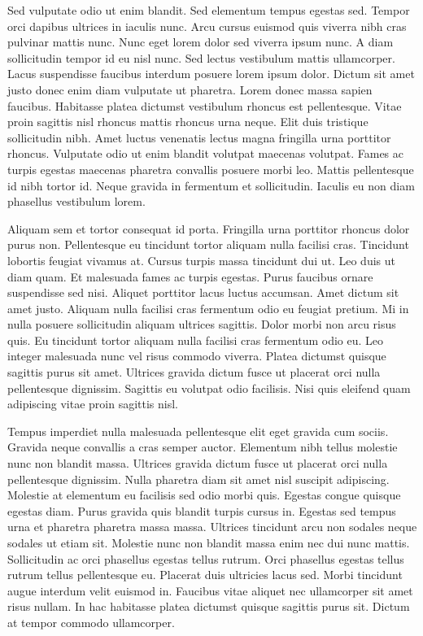 \documentclass[conference]{IEEEtran}
\begin{document}
Sed vulputate odio ut enim blandit. Sed elementum tempus egestas sed. Tempor orci dapibus ultrices in iaculis nunc. Arcu cursus euismod quis viverra nibh cras pulvinar mattis nunc. Nunc eget lorem dolor sed viverra ipsum nunc. A diam sollicitudin tempor id eu nisl nunc. Sed lectus vestibulum mattis ullamcorper. Lacus suspendisse faucibus interdum posuere lorem ipsum dolor. Dictum sit amet justo donec enim diam vulputate ut pharetra. Lorem donec massa sapien faucibus. Habitasse platea dictumst vestibulum rhoncus est pellentesque. Vitae proin sagittis nisl rhoncus mattis rhoncus urna neque. Elit duis tristique sollicitudin nibh. Amet luctus venenatis lectus magna fringilla urna porttitor rhoncus. Vulputate odio ut enim blandit volutpat maecenas volutpat. Fames ac turpis egestas maecenas pharetra convallis posuere morbi leo. Mattis pellentesque id nibh tortor id. Neque gravida in fermentum et sollicitudin. Iaculis eu non diam phasellus vestibulum lorem.

Aliquam sem et tortor consequat id porta. Fringilla urna porttitor rhoncus dolor purus non. Pellentesque eu tincidunt tortor aliquam nulla facilisi cras. Tincidunt lobortis feugiat vivamus at. Cursus turpis massa tincidunt dui ut. Leo duis ut diam quam. Et malesuada fames ac turpis egestas. Purus faucibus ornare suspendisse sed nisi. Aliquet porttitor lacus luctus accumsan. Amet dictum sit amet justo. Aliquam nulla facilisi cras fermentum odio eu feugiat pretium. Mi in nulla posuere sollicitudin aliquam ultrices sagittis. Dolor morbi non arcu risus quis. Eu tincidunt tortor aliquam nulla facilisi cras fermentum odio eu. Leo integer malesuada nunc vel risus commodo viverra. Platea dictumst quisque sagittis purus sit amet. Ultrices gravida dictum fusce ut placerat orci nulla pellentesque dignissim. Sagittis eu volutpat odio facilisis. Nisi quis eleifend quam adipiscing vitae proin sagittis nisl.

Tempus imperdiet nulla malesuada pellentesque elit eget gravida cum sociis. Gravida neque convallis a cras semper auctor. Elementum nibh tellus molestie nunc non blandit massa. Ultrices gravida dictum fusce ut placerat orci nulla pellentesque dignissim. Nulla pharetra diam sit amet nisl suscipit adipiscing. Molestie at elementum eu facilisis sed odio morbi quis. Egestas congue quisque egestas diam. Purus gravida quis blandit turpis cursus in. Egestas sed tempus urna et pharetra pharetra massa massa. Ultrices tincidunt arcu non sodales neque sodales ut etiam sit. Molestie nunc non blandit massa enim nec dui nunc mattis. Sollicitudin ac orci phasellus egestas tellus rutrum. Orci phasellus egestas tellus rutrum tellus pellentesque eu. Placerat duis ultricies lacus sed. Morbi tincidunt augue interdum velit euismod in. Faucibus vitae aliquet nec ullamcorper sit amet risus nullam. In hac habitasse platea dictumst quisque sagittis purus sit. Dictum at tempor commodo ullamcorper.
\end{document}
